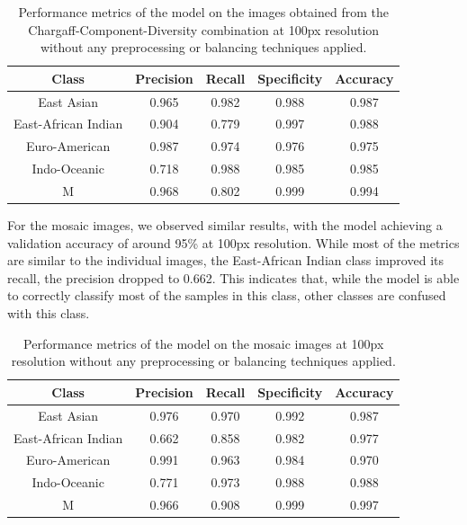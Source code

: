 \begin{table}[H]
	\centering
	\begin{tabular}{|c|c|c|c|c|}
		\hline
		\textbf{Class}      & \textbf{Precision} & \textbf{Recall} & \textbf{Specificity} & \textbf{Accuracy} \\
		\hline
		East Asian          & 0.965              & 0.982           & 0.988                & 0.987             \\
		East-African Indian & 0.904              & 0.779           & 0.997                & 0.988             \\
		Euro-American       & 0.987              & 0.974           & 0.976                & 0.975             \\
		Indo-Oceanic        & 0.718              & 0.988           & 0.985                & 0.985             \\
		M                   & 0.968              & 0.802           & 0.999                & 0.994             \\
		\hline
	\end{tabular}
	\caption{Performance metrics of the model on the images obtained from the Chargaff-Component-Diversity combination at 100px resolution without any
		preprocessing or balancing techniques applied.}
	\label{tab:performance_metrics_100px_std}
\end{table}

For the mosaic images, we observed similar results, with the model achieving a validation accuracy of around 95\% at 100px resolution. While most of the metrics
are similar to the individual images, the East-African Indian class improved its recall, the precision dropped to 0.662. This indicates that, while the model is able to
correctly classify most of the samples in this class, other classes are confused with this class.

\begin{table}[H]
	\centering
	\begin{tabular}{|c|c|c|c|c|}
		\hline
		\textbf{Class}      & \textbf{Precision} & \textbf{Recall} & \textbf{Specificity} & \textbf{Accuracy} \\
		\hline
		East Asian          & 0.976              & 0.970           & 0.992                & 0.987             \\
		East-African Indian & 0.662              & 0.858           & 0.982                & 0.977             \\
		Euro-American       & 0.991              & 0.963           & 0.984                & 0.970             \\
		Indo-Oceanic        & 0.771              & 0.973           & 0.988                & 0.988             \\
		M                   & 0.966              & 0.908           & 0.999                & 0.997             \\
		\hline
	\end{tabular}
	\caption{Performance metrics of the model on the mosaic images at 100px resolution without any preprocessing or balancing techniques applied.}
	\label{tab:performance_metrics_mosaic_std}
\end{table}

